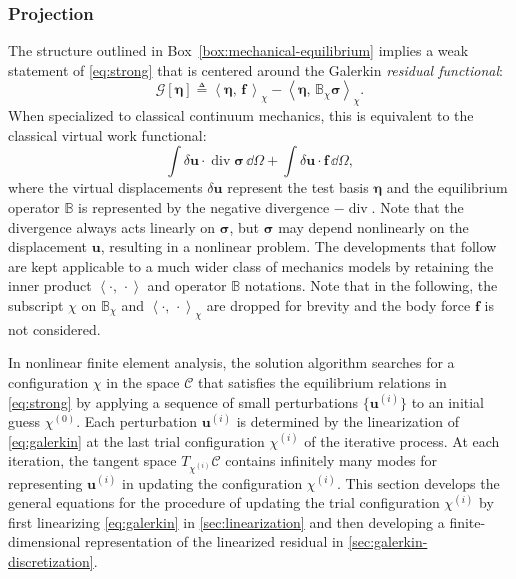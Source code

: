 

\hypertarget{sec:discretization}{%
\subsubsection{Projection}\label{sec:discretization}}

The structure outlined in Box~\ref{box:mechanical-equilibrium} implies a weak statement
of \eqref{eq:strong} that is centered around the Galerkin \emph{residual functional}:
%
\begin{equation}
\mathcal{G}\left[\bm{\eta}\right] \triangleq \left< \bm{\eta}, \, \bm{f}\,\right>_\chi - \left< \bm{\eta}, \, \mathbb{B}_\chi \bm{\sigma}\right>_\chi.
\label{eq:galerkin}
\end{equation}
%
When specialized to classical continuum mechanics, this is equivalent to the classical virtual work functional:
\begin{equation}
\int \delta\bm{u} \cdot \operatorname{div} \bm{\sigma}\, \dd\Omega +  \int \delta \bm{u} \cdot \bm{f}\, \dd\Omega, 
\label{eq:VW}
\end{equation}
where the virtual displacements \(\delta \bm{u}\) represent the test basis \(\bm{\eta}\) and the equilibrium operator $\mathbb{B}$ is represented by the negative divergence $-\operatorname{div}$. 
Note that the divergence always acts linearly on \(\bm{\sigma}\), but \(\bm{\sigma}\) may depend nonlinearly on the displacement \(\bm{u}\), resulting in a nonlinear problem.
The developments that follow
are kept applicable to a much wider class of mechanics models by retaining 
the inner product \(\left<\cdot,\,\cdot\right>\) and operator \(\mathbb{B}\) notations.
Note that in the following, 
the subscript \(\chi\) on \(\mathbb{B}_\chi\) and
\(\left<\cdot,\,\cdot\right>_\chi\) are dropped 
for brevity %
and the body force \(\bm{f}\)
is not considered.

In nonlinear finite element analysis,
the solution algorithm searches for a configuration \(\chi\) in the space \(\mathscr{C}\) that satisfies the
equilibrium relations in
\eqref{eq:strong} by applying a sequence of small
perturbations \(\{\bm{u}^{(i)}\}\) to an initial guess \(\chi^{(0)}\).
Each perturbation \(\bm{u}^{(i)}\) is determined by the linearization of
\eqref{eq:galerkin} at %
the last trial configuration \(\chi^{(i)}\) of the iterative process.
At each iteration, the tangent space \(T_{\chi^{(i)}}\mathscr{C}\) contains infinitely many modes
for representing \(\bm{u}^{(i)}\) in %
updating the configuration \(\chi^{(i)}\).
This section develops the general equations for %
the procedure of updating the trial configuration \(\chi^{(i)}\)
by first linearizing \eqref{eq:galerkin} in \cref{sec:linearization} and then developing a
finite-dimensional representation of the linearized residual in
\cref{sec:galerkin-discretization}.

